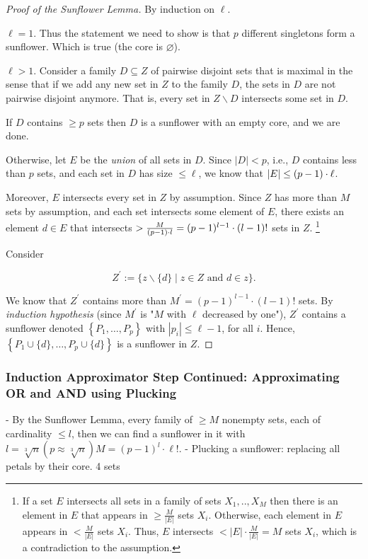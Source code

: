 \begin{proof}[Proof of the Sunflower Lemma]
By induction on $\ell$.

\Base  $\ell=1$. Thus the statement we need to show is that $p$ different singletons form a sunflower. Which is true (the core is $\varnothing$).


\induction $\ell>1$. Consider a family $D \subseteq Z$ of pairwise disjoint sets that is maximal in the sense that if we add any new set in $Z$ to the family $D$, the sets in $D$ are not pairwise disjoint anymore. That is, every set in $Z \backslash D$ intersects some set in $D$.

 If $D$ contains $\geq p$ sets then $D$ is a sunflower with an empty core, and we are done.

 Otherwise, let $E$ be the \emph{union} of all sets in $D$.
Since $|D|<p$, i.e., $D$ contains less than $p$ sets, and each set in $D$ has size $\le \ell$, we know that $|E| \leq(p-1)\cdot\ell$.

\medskip 

Moreover, $E$ intersects every set in $Z$ by assumption.
Since $Z$ has more than $M$ sets by assumption, and each set intersects some element of $E$, there exists an element $d \in E$ that intersects $>\frac{M}{(p-1)\cdot l}=(p-1)^{l-1} \cdot(l-1)!$ sets in $Z$.
\footnote{If a set $E$ intersects all sets in a family of sets $X_1, . ., X_M$ then there is an element in $E$ that appears in $\geq \frac{M}{|E|}$ sets $X_i$.
Otherwise, each element in $E$ appears in $<\frac{M}{|E|}$ sets $X_i$. Thus, $E$ intersects $<|E| \cdot \frac{M}{|E|}=M$ sets $X_i$, which is a contradiction to the assumption.
}

Consider

$$
Z^{\prime}:=\{z \backslash\{d\} \mid z \in Z \text { and } d \in z\} .
$$


We know that $Z^{\prime}$ contains more than $M^{\prime}=(p-1)^{l-1} \cdot(l-1)!$ sets.
By \emph{induction hypothesis} (since $M^{\prime}$ is "$M$ with $\ell$ decreased by one"), $Z^{\prime}$ contains a sunflower denoted $\left\{P_1, \ldots, P_p\right\}$ with $\left|p_i\right| \leq \ell-1$, for all $i$.
Hence, $\left\{P_1 \cup\{d\}, \ldots, P_p \cup\{d\}\right\}$ is a sunflower in $Z$.
\end{proof}

\newpage{}

\subsubsection{Induction Approximator Step Continued: Approximating OR and AND using Plucking}
- By the Sunflower Lemma, every family of $\geq M$ nonempty sets, each of cardinality $\leq l$, then we can find a sunflower in it with $l=\sqrt[3]{n}(p \approx \sqrt[3]{n}) M=(p-1)^l \cdot \ell!$.
- Plucking a sunflower: replacing all petals by their core. 4 sets


